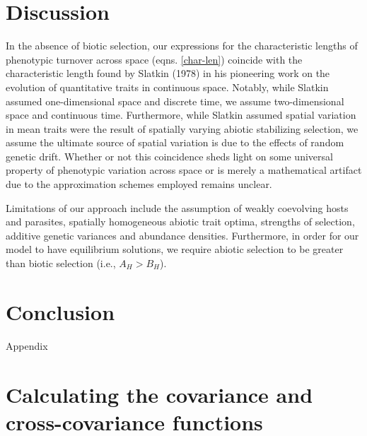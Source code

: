 \documentclass{article}
\begin{document}
\hypertarget{discussion}{%
\section{Discussion}\label{discussion}}

In the absence of biotic selection, our expressions for the
characteristic lengths of phenotypic turnover across space (eqns.
\ref{char-len}) coincide with the characteristic length found by Slatkin
(1978) in his pioneering work on the evolution of quantitative traits in
continuous space. Notably, while Slatkin assumed one-dimensional space
and discrete time, we assume two-dimensional space and continuous time.
Furthermore, while Slatkin assumed spatial variation in mean traits were
the result of spatially varying abiotic stabilizing selection, we assume
the ultimate source of spatial variation is due to the effects of random
genetic drift. Whether or not this coincidence sheds light on some
universal property of phenotypic variation across space or is merely a
mathematical artifact due to the approximation schemes employed remains
unclear.

Limitations of our approach include the assumption of weakly coevolving
hosts and parasites, spatially homogeneous abiotic trait optima,
strengths of selection, additive genetic variances and abundance
densities. Furthermore, in order for our model to have equilibrium
solutions, we require abiotic selection to be greater than biotic
selection (i.e., \(A_H>B_H\)).

\hypertarget{conclusion}{%
\section{Conclusion}\label{conclusion}}

\newpage

\appendix

\begin{center}
\Large{Appendix}
\end{center}

\hypertarget{calculating-the-covariance-and-cross-covariance-functions}{%
\section{\texorpdfstring{Calculating the covariance and cross-covariance
functions
\label{spde-app}}{Calculating the covariance and cross-covariance functions }}\label{calculating-the-covariance-and-cross-covariance-functions}}
\end{document}
